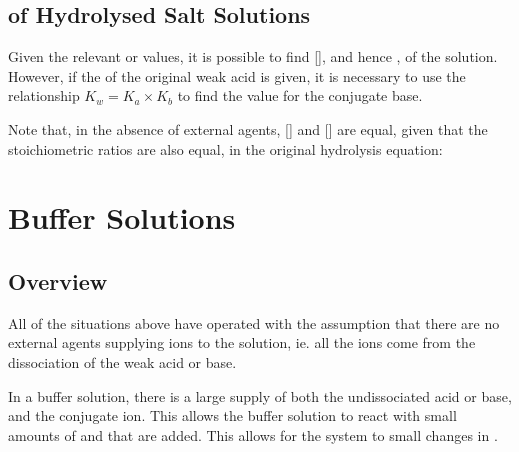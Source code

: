 		\subsection{\texorpdfstring{\pH{}}{pH} of Hydrolysed Salt Solutions}

			Given the relevant \Ka{} or \Kb{} values, it is possible to find [], and hence \pH{}, of the solution. However,
			if the \Ka{} of the original weak acid is given, it is necessary to use the relationship $K_{w} = K_{a} \times K_{b}$ to find
			the \Kb{} value for the conjugate base.

			\eqndiagram{
				\[ K_{b} = \frac{K_{w}}{K_{a}}  \hspace{15mm}  K_{b} = \frac{[\ch{CH3CO2H}][\ch{OH-}]}{[\ch{CH3CO2-}]} \]
			}
			Note that, in the absence of external agents, [] and [] are equal, given that the stoichiometric ratios
			are also equal, in the original hydrolysis equation:





	\section{Buffer Solutions}

		\subsection{Overview}

			All of the situations above have operated with the assumption that there are no external agents supplying ions to the solution,
			ie. all the ions come from the dissociation of the weak acid or base.

			In a buffer solution, there is a large supply of both the undissociated acid or base, and the conjugate ion. This allows the
			buffer solution to react with small amounts of   and  that are added. This allows for the system
			to  small changes in \pH{}.



